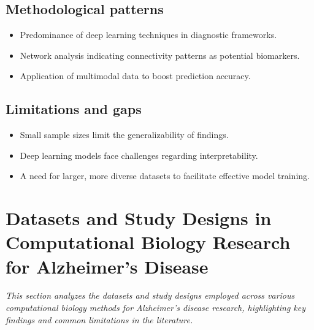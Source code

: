 \documentclass{MITcsail}
\begin{document}
\subsection*{Methodological patterns}
\begin{itemize}
  \item Predominance of deep learning techniques in diagnostic frameworks.
  \item Network analysis indicating connectivity patterns as potential biomarkers.
  \item Application of multimodal data to boost prediction accuracy.
\end{itemize}

\subsection*{Limitations and gaps}
\begin{itemize}
  \item Small sample sizes limit the generalizability of findings.
  \item Deep learning models face challenges regarding interpretability.
  \item A need for larger, more diverse datasets to facilitate effective model training.
\end{itemize}

\section{Datasets and Study Designs in Computational Biology Research for Alzheimer's Disease}

\textit{This section analyzes the datasets and study designs employed across various computational biology methods for Alzheimer's disease research, highlighting key findings and common limitations in the literature.}
\end{document}
